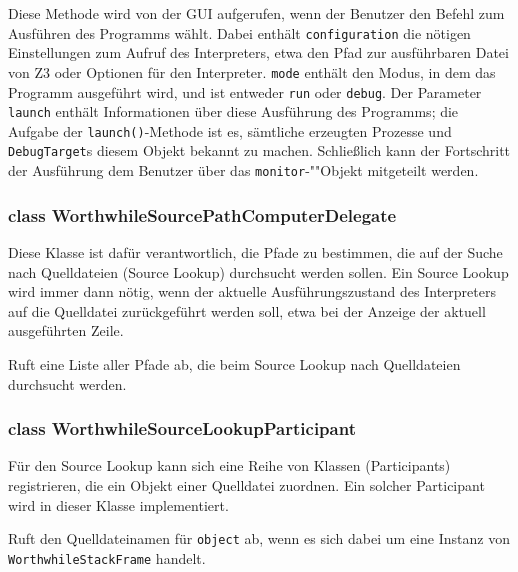 \begin{description}
	Diese Methode wird von der GUI aufgerufen, wenn der Benutzer den Befehl zum Ausführen des Programms wählt. Dabei enthält \texttt{configuration} die nötigen Einstellungen zum Aufruf des Interpreters, etwa den Pfad zur ausführbaren Datei von Z3 oder Optionen für den Interpreter. \texttt{mode} enthält den Modus, in dem das Programm ausgeführt wird, und ist entweder \texttt{run} oder \texttt{debug}. Der Parameter \texttt{launch} enthält Informationen über diese Ausführung des Programms; die Aufgabe der \texttt{launch()}-Methode ist es, sämtliche erzeugten Prozesse und \texttt{DebugTarget}s diesem Objekt bekannt zu machen. Schließlich kann der Fortschritt der Ausführung dem Benutzer über das \texttt{monitor}-""Objekt mitgeteilt werden.
\end{description}

\subsubsection{class WorthwhileSourcePathComputerDelegate}

Diese Klasse ist dafür verantwortlich, die Pfade zu bestimmen, die auf der Suche nach Quelldateien (Source Lookup) durchsucht werden sollen. Ein Source Lookup wird immer dann nötig, wenn der aktuelle Ausführungszustand des Interpreters auf die Quelldatei zurückgeführt werden soll, etwa bei der Anzeige der aktuell ausgeführten Zeile.

\begin{description}
	Ruft eine Liste aller Pfade ab, die beim Source Lookup nach Quelldateien durchsucht werden.
\end{description}

\subsubsection{class WorthwhileSourceLookupParticipant}

Für den Source Lookup kann sich eine Reihe von Klassen (Participants) registrieren, die ein Objekt einer Quelldatei zuordnen. Ein solcher Participant wird in dieser Klasse implementiert.

\begin{description}
	 Ruft den Quelldateinamen für \texttt{object} ab, wenn es sich dabei um eine Instanz von \texttt{WorthwhileStackFrame} handelt.
\end{description}

